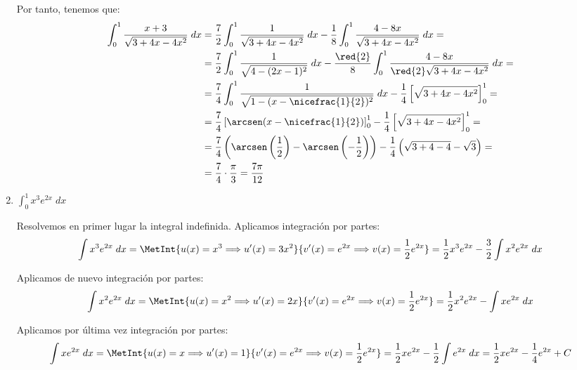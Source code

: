 \begin{ejercicio}
\begin{enumerate}
        Por tanto, tenemos que:
        \begin{align*}
            \int_0^1 \frac{x+3}{\sqrt{3+4x-4x^2}}\;dx
            &= \frac{7}{2} \int_0^1 \frac{1}{\sqrt{3+4x-4x^2}}\;dx
            - \frac{1}{8} \int_0^1 \frac{4-8x}{\sqrt{3+4x-4x^2}}\;dx =\\
            &= \frac{7}{2} \int_0^1 \frac{1}{\sqrt{4-(2x-1)^2}}\;dx
            - \frac{\red{2}}{8} \int_0^1 \frac{4-8x}{\red{2}\sqrt{3+4x-4x^2}}\;dx =\\
            &= \frac{7}{4} \int_0^1 \frac{1}{\sqrt{1-(x-\nicefrac{1}{2})^2}}\;dx
            - \frac{1}{4} \left[\sqrt{3+4x-4x^2}\right]_0^1 =\\
            &= \frac{7}{4}\left[\arcsen (x-\nicefrac{1}{2})\right]_0^1 - \frac{1}{4} \left[\sqrt{3+4x-4x^2}\right]_0^1 =\\
            &= \frac{7}{4}\left(\arcsen \left(\frac{1}{2}\right)-\arcsen \left(-\frac{1}{2}\right)\right) - \frac{1}{4} \left(\sqrt{3+4-4}-\sqrt{3}\right) =\\
            &= \frac{7}{4}\cdot \frac{\pi}{3} = \frac{7\pi}{12}
        \end{align*}

        \item $\displaystyle \int_0^1 x^3 e^{2x}\;dx$
        
        Resolvemos en primer lugar la integral indefinida. Aplicamos integración por partes:
        \begin{equation*}
            \int x^3 e^{2x}\;dx
            = \MetInt{u(x)=x^3 \Longrightarrow u'(x)=3x^2}{v'(x)=e^{2x} \Longrightarrow v(x)=\frac{1}{2}e^{2x}}
            = \frac{1}{2}x^3 e^{2x} - \frac{3}{2}\int x^2 e^{2x}\;dx
        \end{equation*}

        Aplicamos de nuevo integración por partes:
        \begin{equation*}
            \int x^2 e^{2x}\;dx
            = \MetInt{u(x)=x^2 \Longrightarrow u'(x)=2x}{v'(x)=e^{2x} \Longrightarrow v(x)=\frac{1}{2}e^{2x}}
            = \frac{1}{2}x^2 e^{2x} - \int x e^{2x}\;dx
        \end{equation*}

        Aplicamos por última vez integración por partes:
        \begin{equation*}
            \int x e^{2x}\;dx
            = \MetInt{u(x)=x \Longrightarrow u'(x)=1}{v'(x)=e^{2x} \Longrightarrow v(x)=\frac{1}{2}e^{2x}}
            = \frac{1}{2}x e^{2x} - \frac{1}{2}\int e^{2x}\;dx
            = \frac{1}{2}x e^{2x} - \frac{1}{4}e^{2x}+C
        \end{equation*}


\end{enumerate}
\end{ejercicio}
